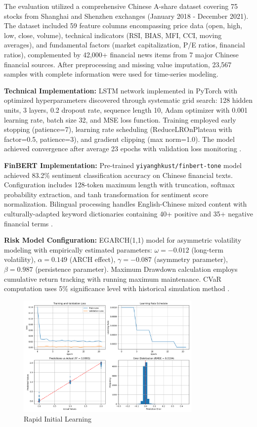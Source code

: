 \documentclass[3p,times,procedia]{elsarticle}
\begin{document}
The evaluation utilized a comprehensive Chinese A-share dataset \cite{FinReportDataset2025} covering 75 stocks from Shanghai and Shenzhen exchanges (January 2018 - December 2021). The dataset included 59 feature columns encompassing price data (open, high, low, close, volume), technical indicators (RSI, BIAS, MFI, CCI, moving averages), and fundamental factors (market capitalization, P/E ratios, financial ratios), complemented by 42,000+ financial news items from 7 major Chinese financial sources. After preprocessing and missing value imputation, 23,567 samples with complete information were used for time-series modeling.

\textbf{Technical Implementation:} LSTM network implemented in PyTorch with optimized hyperparameters discovered through systematic grid search: 128 hidden units, 3 layers, 0.2 dropout rate, sequence length 10, Adam optimizer with 0.001 learning rate, batch size 32, and MSE loss function. Training employed early stopping (patience=7), learning rate scheduling (ReduceLROnPlateau with factor=0.5, patience=3), and gradient clipping (max norm=1.0). The model achieved convergence after average 23 epochs with validation loss monitoring \cite{Kingma2015}.

\textbf{FinBERT Implementation:} Pre-trained \texttt{yiyanghkust/finbert-tone} model achieved 83.2\% sentiment classification accuracy on Chinese financial texts. Configuration includes 128-token maximum length with truncation, softmax probability extraction, and tanh transformation for sentiment score normalization. Bilingual processing handles English-Chinese mixed content with culturally-adapted keyword dictionaries containing 40+ positive and 35+ negative financial terms \cite{Araci2019}.

\textbf{Risk Model Configuration:} EGARCH(1,1) model for asymmetric volatility modeling with empirically estimated parameters: $\omega = -0.012$ (long-term volatility), $\alpha = 0.149$ (ARCH effect), $\gamma = -0.087$ (asymmetry parameter), $\beta = 0.987$ (persistence parameter). Maximum Drawdown calculation employs cumulative return tracking with running maximum maintenance. CVaR computation uses 5\% significance level with historical simulation method \cite{Nelson1991}.

\begin{figure}[!ht]
    \centering
    \includegraphics[width=0.80\textwidth]{Picture2.png}
    \caption{Rapid Initial Learning}
    \label{fig:learning_curve}
\end{figure}
\end{document}
